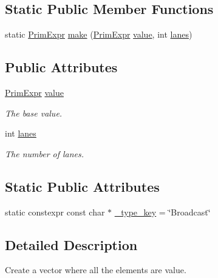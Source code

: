 \subsection*{Static Public Member Functions}
\begin{DoxyCompactItemize}
\item 
static \hyperlink{classtvm_1_1PrimExpr}{Prim\+Expr} \hyperlink{classtvm_1_1tir_1_1BroadcastNode_a6763d63d93677c038763d1f985f877e0}{make} (\hyperlink{classtvm_1_1PrimExpr}{Prim\+Expr} \hyperlink{classtvm_1_1tir_1_1BroadcastNode_ac57a290b1c990251951305769d340bdd}{value}, int \hyperlink{classtvm_1_1tir_1_1BroadcastNode_a2190fc3b4957c2307e8de59e1bd3f025}{lanes})
\end{DoxyCompactItemize}
\subsection*{Public Attributes}
\begin{DoxyCompactItemize}
\item 
\hyperlink{classtvm_1_1PrimExpr}{Prim\+Expr} \hyperlink{classtvm_1_1tir_1_1BroadcastNode_ac57a290b1c990251951305769d340bdd}{value}
\begin{DoxyCompactList}\small\item\em The base value. \end{DoxyCompactList}\item 
int \hyperlink{classtvm_1_1tir_1_1BroadcastNode_a2190fc3b4957c2307e8de59e1bd3f025}{lanes}
\begin{DoxyCompactList}\small\item\em The number of lanes. \end{DoxyCompactList}\end{DoxyCompactItemize}
\subsection*{Static Public Attributes}
\begin{DoxyCompactItemize}
\item 
static constexpr const char $\ast$ \hyperlink{classtvm_1_1tir_1_1BroadcastNode_a10f5924649cdeb463daaebaceb09c6b6}{\+\_\+type\+\_\+key} = \char`\"{}Broadcast\char`\"{}
\end{DoxyCompactItemize}


\subsection{Detailed Description}
Create a vector where all the elements are value. 

